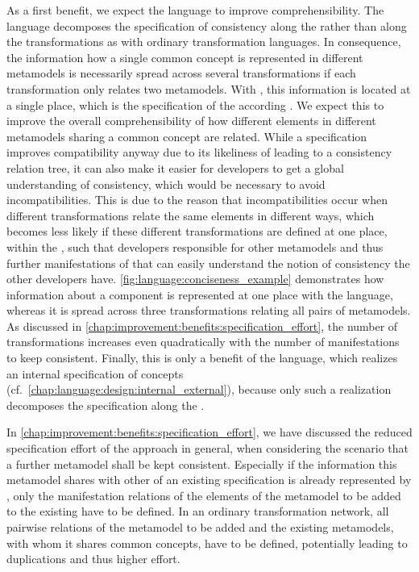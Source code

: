 As a first benefit, we expect the \commonalities language to improve comprehensibility.
The language decomposes the specification of consistency along the \commonalities rather than along the transformations as with ordinary transformation languages.
In consequence, the information how a single common concept is represented in different metamodels is necessarily spread across several transformations if each transformation only relates two metamodels.
With \commonalities, this information is located at a single place, which is the specification of the according \commonality.
We expect this to improve the overall comprehensibility of how different elements in different metamodels sharing a common concept are related.
While a \commonalities specification improves compatibility anyway due to its likeliness of leading to a consistency relation tree, it can also make it easier for developers to get a global understanding of consistency, which would be necessary to avoid incompatibilities.
This is due to the reason that incompatibilities occur when different transformations relate the same elements in different ways, which becomes less likely if these different transformations are defined at one place, within the \commonality, such that developers responsible for other metamodels and thus further manifestations of that \commonality can easily understand the notion of consistency the other developers have.
\autoref{fig:language:conciseness_example} demonstrates how information about a component \commonality is represented at one place with the \commonalities language, whereas it is spread across three \qvtr transformations relating all pairs of metamodels.
As discussed in \autoref{chap:improvement:benefits:specification_effort}, the number of transformations increases even quadratically with the number of manifestations to keep consistent.
Finally, this is only a benefit of the \commonalities language, which realizes an internal specification of concepts (cf.\ \autoref{chap:language:design:internal_external}), because only such a realization decomposes the specification along the \commonalities.

In \autoref{chap:improvement:benefits:specification_effort}, we have discussed the reduced specification effort of the \commonalities approach in general, when considering the scenario that a further metamodel shall be kept consistent.
Especially if the information this metamodel shares with other \concretemetamodels of an existing \commonalities specification is already represented by \commonalities, only the manifestation relations of the elements of the metamodel to be added to the existing \commonalities have to be defined.
In an ordinary transformation network, all pairwise relations of the metamodel to be added and the existing metamodels, with whom it shares common concepts, have to be defined, potentially leading to duplications and thus higher effort.

